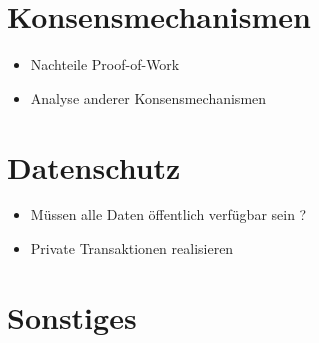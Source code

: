 \label{subsec:eval-konsens}
\section{Konsensmechanismen}




\begin{itemize}
    \item Nachteile Proof-of-Work
    \item Analyse anderer Konsensmechanismen
\end{itemize}

\section{Datenschutz}

\begin{itemize}
    \item Müssen alle Daten öffentlich verfügbar sein ?
    \item Private Transaktionen realisieren
\end{itemize}

\section{Sonstiges}




